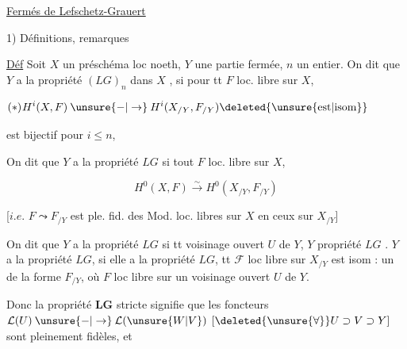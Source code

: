 
\uline{Fermés de Lefschetz-Grauert}

1) Définitions, remarques

\uline{Déf} Soit $X$ un préschéma loc noeth, $Y$ une partie fermée, $n$ un entier. On dit que $Y$ a la propriété $(LG)_n$ dans $X$ , si pour tt $F$ loc. libre sur $X$,

\[
H^i(X,F)\mathbin{\unsure{-|\to}}H^i(X_{/Y},F_{/Y})\deleted{\unsure{\mathrm{est}|\mathrm{isom}}}
\tag*{\makebox[0pt][r]{\makebox[\linewidth][l]{$(\ast)$}}}
\]

est bijectif pour $i\leq n$, 

On dit que $Y$ a la propriété $LG$  si   tout $F$ loc. libre sur $X$,

\[
H^0(X,F)\overset{\sim}{\longrightarrow}H^0(X_{/Y},F_{/Y})
\]

[$i.e.$ $F\leadsto F_{/Y}$ est ple. fid. des Mod. loc. libres sur $X$ en ceux sur $X_{/Y}$]

On dit que $Y$ a la propriété $LG$   si tt  voisinage ouvert $U$ de $Y$, $Y$   propriété $LG$ . \uline{} $Y$ a la propriété $LG$,   si elle a la propriété $LG$,  
tt $\mathcal F$ loc libre sur $X_{/Y}$  est isom : un  de la forme $F_{/Y}$, où $F$ loc libre sur un voisinage ouvert $U$ de $Y$.

Donc la propriété \textbf{LG} stricte signifie que les foncteurs $\mathcal L(U)\mathbin{\unsure{-|\to}}\mathcal L(\unsure{W|V})$ $[\deleted{\unsure{\forall}}U\supset V\supset Y]$ sont pleinement fidèles, et

